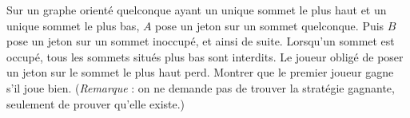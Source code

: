 Sur un graphe orienté quelconque ayant un unique sommet le plus haut et un unique sommet le plus bas, $A$ pose un jeton sur un sommet quelconque. Puis $B$ pose un jeton sur un sommet inoccupé, et ainsi de suite. Lorsqu'un sommet est occupé, tous les sommets situés plus bas sont interdits. Le joueur obligé de poser un jeton sur le sommet le plus haut perd. Montrer que le premier joueur gagne s'il joue bien. (\emph{Remarque} : on ne demande pas de trouver la stratégie gagnante, seulement de prouver qu'elle existe.)

